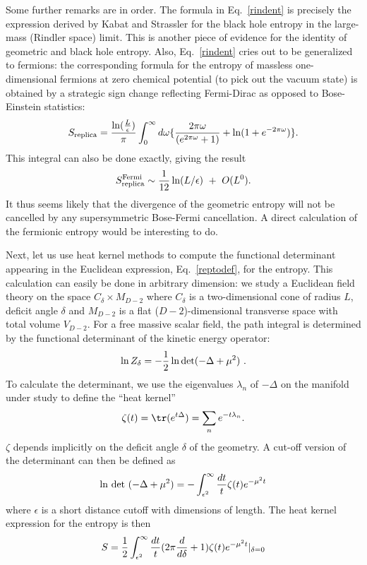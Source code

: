 \documentclass[12pt]{article}
\begin{document}
Some further remarks are in order. The formula in Eq.~\ref{rindent} is precisely
the expression derived by Kabat and Strassler \cite{kabat} for the black hole
entropy in the large-mass (Rindler space) limit. This is another piece of
evidence for the identity of geometric and black hole entropy. Also,
Eq.~\ref{rindent} cries out to be generalized to fermions: the corresponding
formula for the entropy of massless one-dimensional fermions at zero chemical
potential (to pick out the vacuum state) is obtained by a strategic sign
change reflecting Fermi-Dirac as opposed to Bose-Einstein statistics:
\begin{equation}
S_{\rm replica} = {\ln({L\over\epsilon})\over\pi}
\int_0^\infty d\omega \{
{2\pi\omega\over(e^{2\pi\omega}+1)}+\ln(1+e^{-2\pi\omega})\}.
\label{rindferment}
\end{equation}
This integral can also be done exactly, giving the result
\begin{equation}
	S_{\rm replica}^{\rm Fermi}\sim {1\over 12} \ln(L/\epsilon)~+~O(L^0).
\end{equation}
It thus seems likely that the divergence of the geometric entropy will not
be cancelled by any supersymmetric Bose-Fermi cancellation. A direct
calculation
of the fermionic entropy would be interesting to do.

Next, let us use heat kernel methods to compute the functional determinant
appearing in the Euclidean expression, Eq.~\ref{reptodef}, for the entropy.
This calculation can easily be done in arbitrary dimension: we study
a Euclidean field theory on the space $C_\delta\times M_{D-2}$ where
$C_\delta$ is a two-dimensional cone of radius $L$, deficit angle
$\delta$ and $M_{D-2}$ is a flat ($D-2$)-dimensional transverse space with
total volume $V_{D-2}$. For a free massive scalar field, the path integral is
determined by the functional determinant of the kinetic energy operator:
\begin{equation}
\ln Z_\delta = -{1\over 2}\ln {\rm det}(-\Delta+\mu^2)~.
\end{equation}
To calculate the determinant, we use the eigenvalues $\lambda_n$ of
$-\Delta$ on the manifold under study to define the ``heat kernel''
\begin{equation}
\zeta(t)= \tr(e^{t\Delta})=\sum_n e^{-t\lambda_n}.
\end{equation}
$\zeta$ depends implicitly on the deficit angle $\delta$ of the geometry.
A cut-off version of the determinant can then be defined as
\begin{equation}
{\rm ln~det~}(-\Delta+\mu^2)=
-\int_{\epsilon^2}^\infty{dt\over t}\zeta(t)e^{-{\mu}^2 t}
\label{heatdet}
\end{equation}
where $\epsilon$ is a short distance cutoff with dimensions of length.
The heat kernel expression for the entropy is then
\begin{equation}
S = {1\over 2}\int_{\epsilon^2}^\infty{dt\over t}
(2\pi{d\over d\delta}+1) \zeta(t) e^{-{\mu}^2 t}|_{\delta=0}
\label{heatent}
\end{equation}
\end{document}
